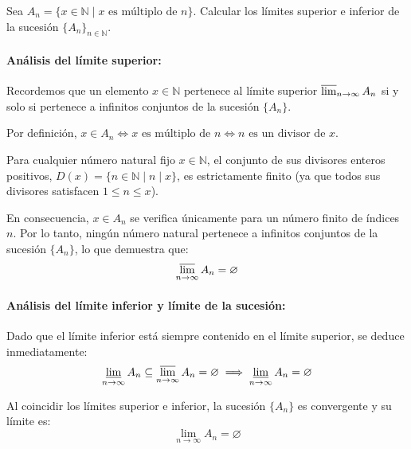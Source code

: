 \newpage
\begin{problema}
Sea $A_n = \{x \in \mathbb{N} \mid x \text{ es múltiplo de } n\}$. Calcular los límites superior e inferior de la sucesión $\{A_n\}_{n \in \mathbb{N}}$.

\tcblower

\paragraph{Análisis del límite superior:}
Recordemos que un elemento $x \in \mathbb{N}$ pertenece al límite superior $\varlimsup_{n \to \infty} A_n$ si y solo si pertenece a infinitos conjuntos de la sucesión $\{A_n\}$.

Por definición, $x \in A_n \iff x \text{ es múltiplo de } n \iff n \text{ es un divisor de } x$.

Para cualquier número natural fijo $x \in \mathbb{N}$, el conjunto de sus divisores enteros positivos, $D(x) = \{n \in \mathbb{N} \mid n \mid x\}$, es estrictamente finito (ya que todos sus divisores satisfacen $1 \le n \le x$). 

En consecuencia, $x \in A_n$ se verifica únicamente para un número finito de índices $n$. Por lo tanto, ningún número natural pertenece a infinitos conjuntos de la sucesión $\{A_n\}$, lo que demuestra que:
\[
    \varlimsup_{n \to \infty} A_n = \varnothing
\]

\paragraph{Análisis del límite inferior y límite de la sucesión:}
Dado que el límite inferior está siempre contenido en el límite superior, se deduce inmediatamente:
\[
    \varliminf_{n \to \infty} A_n \subseteq \varlimsup_{n \to \infty} A_n = \varnothing \implies \varliminf_{n \to \infty} A_n = \varnothing
\]

Al coincidir los límites superior e inferior, la sucesión $\{A_n\}$ es convergente y su límite es:
\[
    \lim_{n \to \infty} A_n = \varnothing
\]
\end{problema}
\newpage
